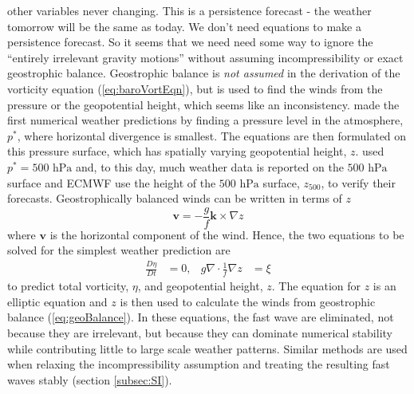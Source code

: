 other variables never changing. This is a persistence forecast - the
weather tomorrow will be the same as today. We don't need equations
to make a persistence forecast. So it seems that we need need some
way to ignore the ``entirely irrelevant gravity motions'' without
assuming incompressibility or exact geostrophic balance. Geostrophic
balance is\textit{ not assumed} in the derivation of the vorticity
equation (\ref{eq:baroVortEqn}), but is used to find the winds from
the pressure or the geopotential height, which seems like an inconsistency.
\citet{CFvN50} made the first numerical weather predictions by finding
a pressure level in the atmosphere, $p^{*}$, where horizontal divergence
is smallest. The equations are then formulated on this pressure surface,
which has spatially varying geopotential height, $z$. \citet{CFvN50}
used $p^{*}=500\text{ hPa}$ and, to this day, much weather data is
reported on the $500\text{ hPa}$ surface and ECMWF use the height
of the $500\text{ hPa}$ surface, $z_{500}$, to verify their forecasts.
Geostrophically balanced winds can be written in terms of $z$
\begin{equation}
\mathbf{v}=-\frac{g}{f}\mathbf{k}\times\nabla z\label{eq:geoBalanceZ}
\end{equation}
where $\mathbf{v}$ is the horizontal component of the wind. Hence,
the two equations to be solved for the simplest weather prediction
are
\begin{align}
\frac{D\eta}{Dt} & =0, & g\nabla\cdot\frac{1}{f}\nabla z & =\xi\label{eq:baroVortGeoVort}
\end{align}
to predict total vorticity, $\eta$, and geopotential height, $z$.
The equation for $z$ is an elliptic equation and $z$ is then used
to calculate the winds from geostrophic balance (\ref{eq:geoBalance}).
In these equations, the fast wave are eliminated, not because they
are irrelevant, but because they can dominate numerical stability
while contributing little to large scale weather patterns. Similar
methods are used when relaxing the incompressibility assumption and
treating the resulting fast waves stably (section \ref{subsec:SI}).

